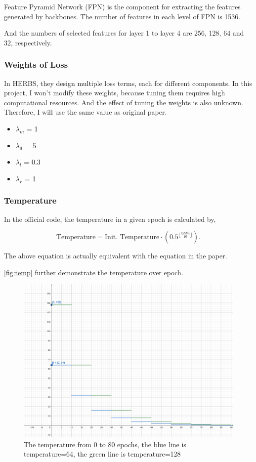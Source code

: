 \documentclass[twocolumn]{extarticle}
\begin{document}
Feature Pyramid Network (FPN) is the component for extracting the features generated by backbones. The number of features in each level of FPN is 1536.

And the numbers of selected features for layer 1 to layer 4 are 256, 128, 64 and 32, respectively.


\subsubsection{Weights of Loss}

In HERBS, they design multiple loss terms, each for different components. In this project, I won't modify these weights, because tuning them requires high computational resources. And the effect of tuning the weights is also unknown. Therefore, I will use the same value as original paper.

\begin{itemize}
\item $\lambda_{m}$ = 1
\item $\lambda_{d}$ = 5
\item $\lambda_{l}$ = 0.3
\item $\lambda_{r}$ = 1
\end{itemize}


\subsubsection{Temperature}

In the official code, the temperature in a given epoch is calculated by,

\begin{equation}
\text{Temperature} = \text{Init. Temperature} \cdot (0.5^{\lfloor\frac{\text{epoch}}{10}\rfloor}).
\end{equation}

The above equation is actually equivalent with the equation in the paper.

\autoref{fig:temp} further demonstrate the temperature over epoch. 

\begin{figure}[H]
\centering
\includegraphics[width=0.95\linewidth]{figure/temp_plot}
\caption{The temperature from 0 to 80 epochs, the blue line is temperature=64, the green line is temperature=128}
\label{fig:temp}
\end{figure}
\end{document}
